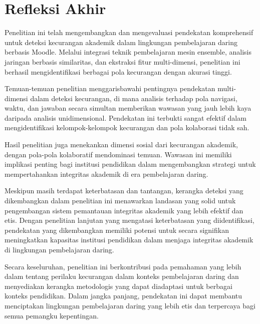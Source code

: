 \section{Refleksi Akhir}
\label{sec:refleksiAkhir}

Penelitian ini telah mengembangkan dan mengevaluasi pendekatan komprehensif untuk deteksi kecurangan akademik dalam lingkungan pembelajaran daring berbasis Moodle. Melalui integrasi teknik pembelajaran mesin ensemble, analisis jaringan berbasis similaritas, dan ekstraksi fitur multi-dimensi, penelitian ini berhasil mengidentifikasi berbagai pola kecurangan dengan akurasi tinggi.

Temuan-temuan penelitian menggarisbawahi pentingnya pendekatan multi-dimensi dalam deteksi kecurangan, di mana analisis terhadap pola navigasi, waktu, dan jawaban secara simultan memberikan wawasan yang jauh lebih kaya daripada analisis unidimensional. Pendekatan ini terbukti sangat efektif dalam mengidentifikasi kelompok-kelompok kecurangan dan pola kolaborasi tidak sah.

Hasil penelitian juga menekankan dimensi sosial dari kecurangan akademik, dengan pola-pola kolaboratif mendominasi temuan. Wawasan ini memiliki implikasi penting bagi institusi pendidikan dalam mengembangkan strategi untuk mempertahankan integritas akademik di era pembelajaran daring.

Meskipun masih terdapat keterbatasan dan tantangan, kerangka deteksi yang dikembangkan dalam penelitian ini menawarkan landasan yang solid untuk pengembangan sistem pemantauan integritas akademik yang lebih efektif dan etis. Dengan penelitian lanjutan yang mengatasi keterbatasan yang diidentifikasi, pendekatan yang dikembangkan memiliki potensi untuk secara signifikan meningkatkan kapasitas institusi pendidikan dalam menjaga integritas akademik di lingkungan pembelajaran daring.

Secara keseluruhan, penelitian ini berkontribusi pada pemahaman yang lebih dalam tentang perilaku kecurangan dalam konteks pembelajaran daring dan menyediakan kerangka metodologis yang dapat diadaptasi untuk berbagai konteks pendidikan. Dalam jangka panjang, pendekatan ini dapat membantu menciptakan lingkungan pembelajaran daring yang lebih etis dan terpercaya bagi semua pemangku kepentingan.
